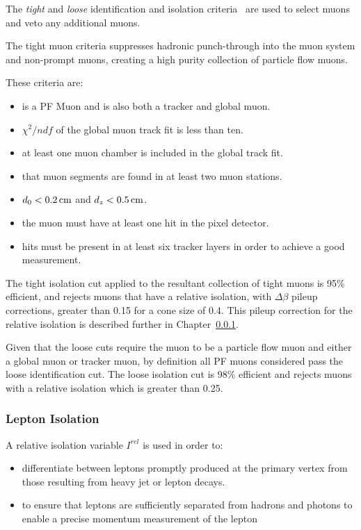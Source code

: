 The \emph{tight} and \emph{loose} identification and isolation criteria~\cite{Chatrchyan:2012xi} are used to select muons and veto any additional muons.

The tight muon criteria suppresses hadronic punch-through into the muon system and non-prompt muons, creating a high purity collection of particle flow muons.

These criteria are:
\begin{itemize}
\item is a PF Muon and is also both a tracker and global muon.
\item $\chi^{2}/ndf$ of the global muon track fit is less than ten. 
\item at least one muon chamber is included in the global track fit.
\item that muon segments are found in at least two muon stations.
\item $d_{0} < 0.2\,\text{cm}$ and $d_{z} < 0.5\,\text{cm}$.
\item the muon must have at least one hit in the pixel detector.
\item hits must be present in at least six tracker layers in order to achieve a good \pT measurement.
\end{itemize}

The tight isolation cut applied to the resultant collection of tight muons is 95\% efficient, and rejects muons that have a relative isolation, with $\Delta\beta$ pileup corrections, greater than 0.15 for a cone size of 0.4.
This pileup correction for the relative isolation is described further in Chapter~\ref{subsubsec:relIso}.

Given that the loose cuts require the muon to be a particle flow muon and either a global muon or tracker muon, by definition all PF muons considered pass the loose identification cut.
The loose isolation cut is 98\% efficient and rejects muons with a relative isolation which is greater than 0.25.

\subsubsection{Lepton Isolation}\label{subsubsec:relIso}
A relative isolation variable $I^{rel}$ is used in order to:
\begin{itemize}
\item differentiate between leptons promptly produced at the primary vertex from those resulting from heavy jet or lepton decays.
\item to ensure that leptons are sufficiently separated from hadrons and photons to enable a precise momentum measurement of the lepton 
\end{itemize}

